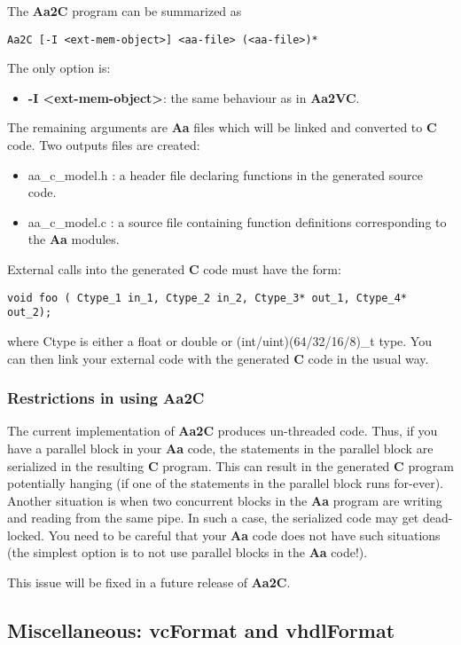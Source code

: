 The {\bf Aa2C} program can be summarized as
\begin{verbatim}
Aa2C [-I <ext-mem-object>] <aa-file> (<aa-file>)*
\end{verbatim}
The only option is:
\begin{itemize}
\item {\bf -I <ext-mem-object>}:  the same behaviour as in {\bf Aa2VC}.
\end{itemize}
The remaining arguments are {\bf Aa} files which will be linked and
converted to {\bf C} code.  Two outputs files are created:
\begin{itemize}
\item aa\_c\_model.h :  a header file declaring functions in the generated
source code.
\item aa\_c\_model.c : a source file containing function definitions
corresponding to the {\bf Aa} modules.
\end{itemize}

External calls into the generated {\bf C} code must have the
form:
\begin{verbatim}
void foo ( Ctype_1 in_1, Ctype_2 in_2, Ctype_3* out_1, Ctype_4* out_2);
\end{verbatim}
where Ctype is either a float or double or (int/uint)(64/32/16/8)\_t type.
You can then link your external code with the generated {\bf C} code
in the usual way.

\subsubsection{Restrictions in using {\bf Aa2C}}

The current implementation of {\bf Aa2C} produces un-threaded code.
Thus, if you have a parallel block in your {\bf Aa} code, the
statements in the parallel block are serialized in the resulting
{\bf C} program.  This can result in the generated {\bf C} program
potentially hanging (if one of the statements in the parallel
block runs for-ever).   Another situation is when two
concurrent blocks in the {\bf Aa} program are writing and reading
from the same pipe.  In such a case, the serialized code may
get dead-locked.  You need to be careful that your {\bf Aa} code
does not have such situations (the simplest option is
to not use parallel blocks in the {\bf Aa} code!).

This issue will be fixed in a future release of {\bf Aa2C}.

\subsection{Miscellaneous: {\bf vcFormat} and {\bf vhdlFormat}}

